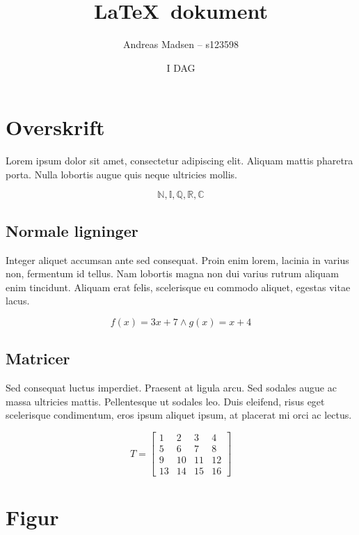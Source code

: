 \documentclass[a4paper]{article}
\begin{document}
\title{\LaTeX\ dokument}
\author{Andreas Madsen – s123598}
\date{I DAG}
\maketitle

\section{Overskrift}

Lorem ipsum dolor sit amet, consectetur adipiscing elit. Aliquam mattis pharetra porta. Nulla lobortis augue quis neque ultricies mollis.

\begin{equation}
  \mathbb{N}, \mathbb{I}, \mathbb{Q}, \mathbb{R}, \mathbb{C}
\end{equation}

\subsection{Normale ligninger}

Integer aliquet accumsan ante sed consequat. Proin enim lorem, lacinia in varius non, fermentum id tellus. Nam lobortis magna non dui varius rutrum aliquam enim tincidunt. Aliquam erat felis, scelerisque eu commodo aliquet, egestas vitae lacus.

\begin{equation}
	f(x) = 3x + 7 \wedge g(x) = x + 4
\end{equation}

\subsection{Matricer}

Sed consequat luctus imperdiet. Praesent at ligula arcu. Sed sodales augue ac massa ultricies mattis. Pellentesque ut sodales leo. Duis eleifend, risus eget scelerisque condimentum, eros ipsum aliquet ipsum, at placerat mi orci ac lectus.

\begin{equation}
  T =
  \begin{bmatrix}
    1 & 2 & 3 & 4  \\
    5 & 6 & 7 & 8  \\
    9 & 10& 11& 12 \\
    13& 14& 15& 16
  \end{bmatrix}
\end{equation}


\section{Figur}
\end{document}

